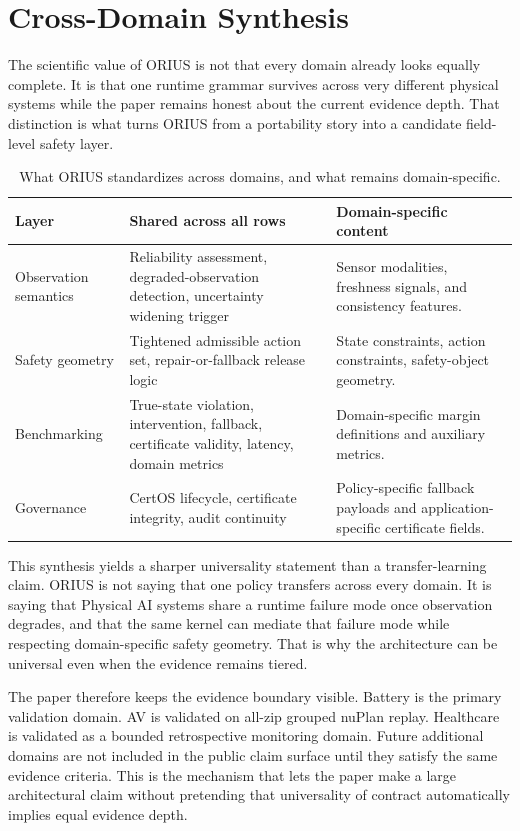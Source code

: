 \section{Cross-Domain Synthesis}
\label{sec:ieee-synthesis}

The scientific value of ORIUS is not that every domain already looks equally complete. It
is that one runtime grammar survives across very different physical systems while the
paper remains honest about the current evidence depth. That distinction
is what turns ORIUS from a portability story into a candidate field-level safety layer.

\begin{table}[t]
\centering
\caption{What ORIUS standardizes across domains, and what remains domain-specific.}
\label{tab:ieee-universal-vs-domain}
\small
\begin{tabularx}{\textwidth}{@{}p{}p{}p{}@{}}
\toprule
\textbf{Layer} & \textbf{Shared across all rows} & \textbf{Domain-specific content}\\
\midrule
Observation semantics & Reliability assessment, degraded-observation detection, uncertainty widening trigger & Sensor modalities, freshness signals, and consistency features.\\
Safety geometry & Tightened admissible action set, repair-or-fallback release logic & State constraints, action constraints, safety-object geometry.\\
Benchmarking & True-state violation, intervention, fallback, certificate validity, latency, domain metrics & Domain-specific margin definitions and auxiliary metrics.\\
Governance & CertOS lifecycle, certificate integrity, audit continuity & Policy-specific fallback payloads and application-specific certificate fields.\\
\bottomrule
\end{tabularx}
\end{table}

This synthesis yields a sharper universality statement than a transfer-learning claim.
ORIUS is not saying that one policy transfers across every domain. It is saying that
Physical AI systems share a runtime failure mode once observation degrades, and that the
same kernel can mediate that failure mode while respecting domain-specific safety
geometry. That is why the architecture can be universal even when the evidence remains
tiered.

The paper therefore keeps the evidence boundary visible. Battery is the primary
validation domain. AV is validated on all-zip grouped nuPlan replay. Healthcare is
validated as a bounded retrospective monitoring domain. Future additional domains are
not included in the public claim surface until they satisfy the same evidence criteria.
This is the mechanism that lets the paper make a large architectural claim without
pretending that universality of contract automatically implies equal evidence depth.

